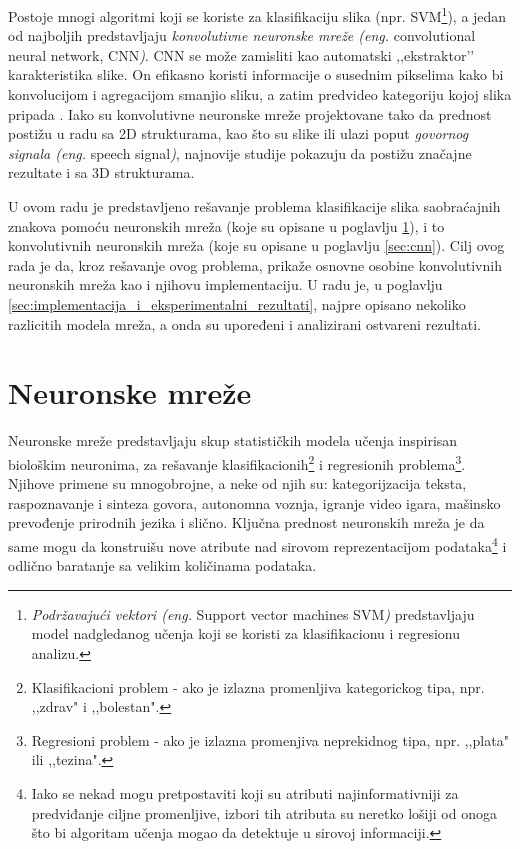 \documentclass[a4paper]{article}
\begin{document}
Postoje mnogi algoritmi koji se koriste za klasifikaciju slika (npr. SVM\footnote{\textit{Podržavajući vektori (eng.} Support vector machines SVM\textit{)} predstavljaju model nadgledanog učenja koji se koristi za klasifikacionu i regresionu analizu.}), a jedan od najboljih predstavljaju \textit{konvolutivne neuronske mreže (eng.} convolutional neural network, CNN\textit{)}. CNN se može zamisliti kao automatski ‚‚ekstraktor’’ karakteristika slike. On efikasno koristi informacije o susednim pikselima kako bi konvolucijom i agregacijom smanjio sliku, a zatim predvideo kategoriju kojoj slika pripada \cite{understandConvNet}. Iako su konvolutivne neuronske mreže projektovane tako da prednost postižu u radu sa 2D strukturama, kao što su slike ili ulazi poput \textit{govornog signala (eng.} speech signal\textit{)}, najnovije studije pokazuju da postižu značajne rezultate i sa 3D strukturama.

U ovom radu je predstavljeno rešavanje problema klasifikacije slika saobraćajnih znakova pomoću neuronskih mreža (koje su opisane u poglavlju \ref{sec:neuronske_mreze}), i to konvolutivnih neuronskih mreža (koje su opisane u poglavlju \ref{sec:cnn}). Cilj ovog rada je da, kroz rešavanje ovog problema, prikaže osnovne osobine konvolutivnih neuronskih mreža kao i njihovu implementaciju. U radu je, u poglavlju \ref{sec:implementacija_i_eksperimentalni_rezultati}, najpre opisano nekoliko razlicitih modela mreža, a onda su upoređeni i analizirani ostvareni rezultati.



\newpage

\section{Neuronske mreže}
\label{sec:neuronske_mreze}

Neuronske mreže predstavljaju skup statističkih modela učenja inspirisan biološkim neuronima, za rešavanje klasifikacionih\footnote{Klasifikacioni problem - ako je izlazna promenljiva kategorickog tipa, npr. ,,zdrav" i ,,bolestan".} i regresionih problema\footnote{Regresioni problem - ako je izlazna promenjiva neprekidnog tipa, npr. ,,plata" ili ,,tezina".}. Njihove primene su mnogobrojne, a neke od njih su: kategorijzacija teksta,
 raspoznavanje i sinteza govora, autonomna voznja, igranje video igara, mašinsko prevođenje prirodnih jezika i slično. Ključna prednost neuronskih mreža je da same mogu da konstruišu nove atribute nad sirovom reprezentacijom podataka\footnote{Iako se nekad mogu pretpostaviti koji su atributi najinformativniji za predviđanje ciljne promenljive, izbori tih atributa su neretko lošiji od onoga što bi algoritam učenja mogao da detektuje u sirovoj informaciji.} i odlično baratanje sa velikim količinama podataka.
\end{document}
